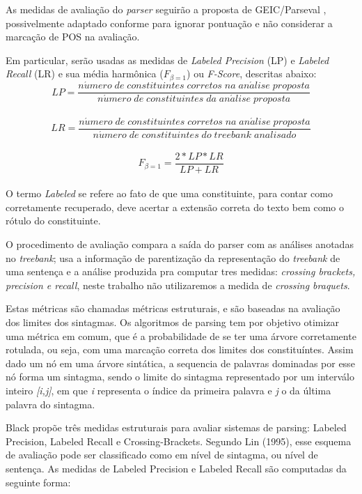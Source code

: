 As medidas de avaliação do \emph{parser} seguirão a proposta de GEIC/Parseval \cite{black91}, possivelmente adaptado conforme \cite{collins97} para ignorar pontuação e não considerar a marcação de POS na avaliação. 

Em particular, serão usadas as medidas de \emph{Labeled Precision} (LP) e \emph{Labeled Recall} (LR) e sua média harmônica ($F_{\beta=1}$) ou \emph{F-Score}, descritas abaixo:
\\
$$LP = \frac{n\acute{u}mero\; de\; constituintes\; corretos\; na\; an\acute{a}lise\; proposta}{n\acute{u}mero\; de\; constituintes\; da\; an\acute{a}lise\; proposta}$$
\\
$$LR = \frac{n\acute{u}mero\; de\; constituintes\; corretos\; na\; an\acute{a}lise\; proposta}{n\acute{u}mero\; de\; constituintes\; do\; \mathit{treebank}\; analisado}$$
\\
$$F_{\beta=1} = \frac{2*LP*LR}{LP+LR}$$
\\
O termo \emph{Labeled} se refere ao fato de que uma constituinte, para contar como corretamente recuperado, deve acertar a extensão correta do texto bem como o rótulo do constituinte.

O procedimento de avaliação compara a saída do parser com as análises anotadas no \emph{treebank}; usa a informação de parentização da representação do \emph{treebank} de uma sentença e a análise produzida pra computar tres medidas: \emph{crossing brackets, precision e recall}, neste trabalho não utilizaremos a medida de \emph{crossing braquets}.

Estas métricas são chamadas métricas estruturais, e são baseadas na avaliação dos limites dos sintagmas. Os algoritmos de parsing tem por objetivo otimizar uma métrica em comum, que é a probabilidade de se ter uma árvore corretamente rotulada, ou seja, com uma marcação correta dos limites dos constituíntes. Assim dado um nó em uma árvore sintática, a sequencia de palavras dominadas por esse nó forma um sintagma, sendo o limite do sintagma representado por um interválo inteiro \emph{[i,j]}, em que \emph{i} representa o índice da primeira palavra e \emph{j} o da última palavra do sintagma.

Black \cite{black91} propõe três medidas estruturais para avaliar sistemas de parsing: Labeled Precision, Labeled Recall e Crossing-Brackets. Segundo Lin (1995), esse esquema de avaliação pode ser classificado como em nível de sintagma, ou nível de sentença. 
As medidas de Labeled Precision e Labeled Recall são computadas da seguinte forma:

